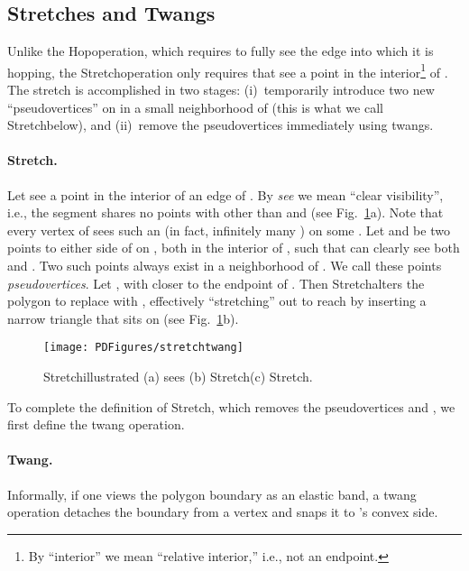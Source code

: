 \pdfoutput=1  \documentclass{article}
\def\st{{\sc Stretch}}
\def\hp{{\sc Hop}}
\def\tw{{\sc Twang}}
\newcommand{\figlab}[1]{\label{fig:#1}}
\newcommand{\seclab}[1]{\label{sec:#1}}
\newcommand{\figref}[1]{\ref{fig:#1}}
\begin{document}
\subsection{Stretches and Twangs}
\seclab{Stretches.Twangs}

Unlike the \hp operation, which requires  to fully see
the edge  into which it is hopping, the \st operation
only requires that  see a point  in the interior\footnote{
   By ``interior'' we mean ``relative interior,''
   i.e., not an endpoint.} of .
The stretch is accomplished in two stages: (i)~temporarily
introduce two new ``pseudovertices'' on  in a small neighborhood
of  (this is what we call \st below), and (ii)~remove the
pseudovertices immediately using twangs.

\paragraph{\st.}
Let  see a point  in the interior of an edge  of . By
\emph{see} we mean ``clear visibility'', i.e., the segment 
shares no points with  other than  and  (see
Fig.~\ref{fig:stretch.twang}a). Note that every vertex  of 
sees such an  (in fact, infinitely many ) on some .
Let  and  be two points to either side of  on ,
both in the interior of ,
such that  can clearly see both  and .
Two such points always exist in a
neighborhood of . We call these points \emph{pseudovertices}. Let
, with  closer to the endpoint  of . Then
\st alters the polygon to replace  with , effectively ``stretching''  out to reach  by
inserting a narrow triangle  that
sits on  (see Fig.~\figref{stretch.twang}b).

\begin{figure}[htbp]
\centering
\texttt{[image: PDFigures/stretchtwang]}
\caption{\st illustrated (a)  sees  (b)
\st (c) \st. } \figlab{stretch.twang}
\end{figure}
To complete the definition of \st, which
removes the pseudovertices  and , we first define the twang operation.

\vspace{-0.5em}
\paragraph{\tw.}
Informally, if one views the polygon boundary as an elastic band, a
twang operation detaches the boundary from a vertex  and snaps it
to 's convex side. 
\end{document}
